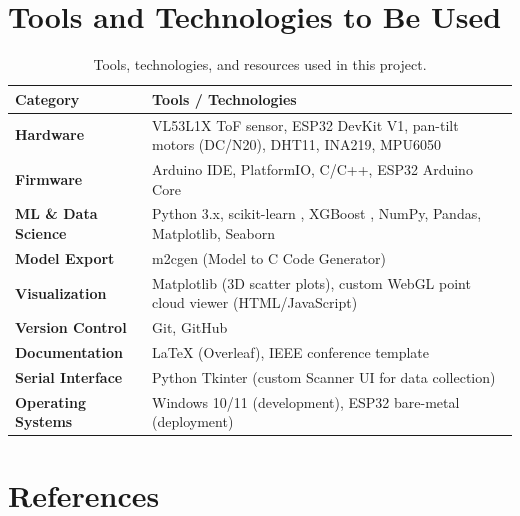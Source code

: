 \documentclass[12pt,a4paper]{article}
\begin{document}
    \section{Tools and Technologies to Be Used}

    \begin{table}[H]
    \centering
    \caption{Tools, technologies, and resources used in this project.}
    \label{tab:tools}
    \begin{tabularx}{\textwidth}{|p{1.2in}|X|}
    \hline
    \textbf{Category} & \textbf{Tools / Technologies} \\
    \hline
    \textbf{Hardware} & VL53L1X ToF sensor, ESP32 DevKit V1, pan-tilt motors (DC/N20), DHT11, INA219, MPU6050 \\
    \hline
    \textbf{Firmware} & Arduino IDE, PlatformIO, C/C++, ESP32 Arduino Core \\
    \hline
    \textbf{ML \& Data Science} & Python 3.x, scikit-learn \cite{pedregosa2011scikit}, XGBoost \cite{chen2016xgboost}, NumPy, Pandas, Matplotlib, Seaborn \\
    \hline
    \textbf{Model Export} & m2cgen (Model to C Code Generator) \\
    \hline
    \textbf{Visualization} & Matplotlib (3D scatter plots), custom WebGL point cloud viewer (HTML/JavaScript) \\
    \hline
    \textbf{Version Control} & Git, GitHub \\
    \hline
    \textbf{Documentation} & \LaTeX{} (Overleaf), IEEE conference template \\
    \hline
    \textbf{Serial Interface} & Python Tkinter (custom Scanner UI for data collection) \\
    \hline
    \textbf{Operating Systems} & Windows 10/11 (development), ESP32 bare-metal (deployment) \\
    \hline
    \end{tabularx}
    \end{table}



    \section{References}

    \renewcommand{\refname}{}
    
    
\end{document}
